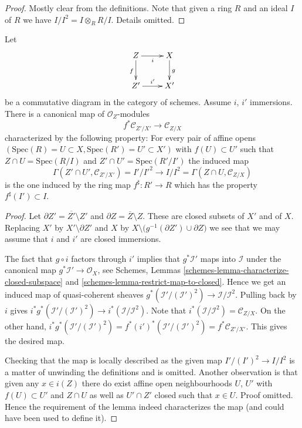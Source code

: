\begin{proof}
Mostly clear from the definitions. Note that given a ring $R$ and
an ideal $I$ of $R$ we have $I/I^2 = I \otimes_R R/I$. Details omitted.
\end{proof}

\begin{lemma}
\label{lemma-conormal-functorial}
Let
$$
\xymatrix{
Z \ar[r]_i \ar[d]_f & X \ar[d]^g \\
Z' \ar[r]^{i'} & X'
}
$$
be a commutative diagram in the category of schemes.
Assume $i$, $i'$ immersions. There is a canonical map
of $\mathcal{O}_Z$-modules
$$
f^*\mathcal{C}_{Z'/X'}
\longrightarrow
\mathcal{C}_{Z/X}
$$
characterized by the following property: For every pair of affine opens
$(\text{Spec}(R) = U \subset X, \text{Spec}(R') = U' \subset X')$ with
$f(U) \subset U'$ such that
$Z \cap U = \text{Spec}(R/I)$ and $Z' \cap U' = \text{Spec}(R'/I')$
the induced map
$$
\Gamma(Z' \cap U', \mathcal{C}_{Z'/X'}) = I'/I'^2
\longrightarrow
I/I^2 = \Gamma(Z \cap U, \mathcal{C}_{Z/X})
$$
is the one induced by the ring map $f^\sharp : R' \to R$ which
has the property $f^\sharp(I') \subset I$.
\end{lemma}

\begin{proof}
Let $\partial Z' = \overline{Z'} \setminus Z'$ and
$\partial Z = \overline{Z} \setminus Z$. These are closed subsets of $X'$ and
of $X$. Replacing $X'$ by $X' \setminus \partial Z'$ and $X$ by
$X \setminus \big(g^{-1}(\partial Z') \cup \partial Z\big)$ we
see that we may assume that $i$ and $i'$ are closed immersions.

\medskip\noindent
The fact that $g \circ i$ factors through $i'$ implies that
$g^*\mathcal{I}'$ maps into $\mathcal{I}$ under the canonical
map $g^*\mathcal{I}' \to \mathcal{O}_X$, see
Schemes, Lemmas
\ref{schemes-lemma-characterize-closed-subspace} and
\ref{schemes-lemma-restrict-map-to-closed}.
Hence we get an induced map of quasi-coherent sheaves
$g^*(\mathcal{I}'/(\mathcal{I}')^2) \to \mathcal{I}/\mathcal{I}^2$.
Pulling back by $i$ gives
$i^*g^*(\mathcal{I}'/(\mathcal{I}')^2) \to i^*(\mathcal{I}/\mathcal{I}^2)$.
Note that $i^*(\mathcal{I}/\mathcal{I}^2) = \mathcal{C}_{Z/X}$.
On the other hand,
$i^*g^*(\mathcal{I}'/(\mathcal{I}')^2) =
f^*(i')^*(\mathcal{I}'/(\mathcal{I}')^2) = f^*\mathcal{C}_{Z'/X'}$.
This gives the desired map.

\medskip\noindent
Checking that the map is locally described as the given map
$I'/(I')^2 \to I/I^2$ is a matter of unwinding the definitions
and is omitted. Another observation is that given any
$x \in i(Z)$ there do exist affine open neighbourhoods $U$, $U'$
with $f(U) \subset U'$ and $Z \cap U$ as well as $U' \cap Z'$
closed such that $x \in U$. Proof omitted. Hence the requirement
of the lemma indeed characterizes the map (and could have been used
to define it).
\end{proof}

